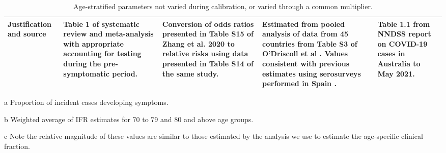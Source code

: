 \begin{table}
\begin{threeparttable}
\begin{tabularx}{\textwidth}{| X | X | X | X | X |}
        \hline
        Justification and source & 
        Table 1 of systematic review and meta-analysis with appropriate accounting for testing during the pre-symptomatic period\cite{sah-2021}. & 
        Conversion of odds ratios presented in Table S15 of Zhang et al. 2020 to relative risks using data presented in Table S14 of the same study\cite{zhang-2020-a}\tnote{c}. &
        Estimated from pooled analysis of data from 45 countries from Table S3 of O'Driscoll et al \cite{odriscoll-2021}. 
        Values consistent with previous estimates using serosurveys performed in Spain \cite{pollan-2020}. &
        Table 1.1 from NNDSS report on COVID-19 cases in Australia to May 2021. \\ 
        \hline
	\end{tabularx}
	\caption{Age-stratified parameters not varied during calibration, or varied through a common multiplier.}
	\label{tab:age_params}
    \begin{tablenotes}
        \item[a] Proportion of incident cases developing symptoms.
        \item[b] Weighted average of IFR estimates for 70 to 79 and 80 and above age groups.
        \item[c] Note the relative magnitude of these values are similar to those estimated by the analysis we use to estimate the age-specific clinical fraction.
    \end{tablenotes}
    \end{threeparttable}
\end{table}

